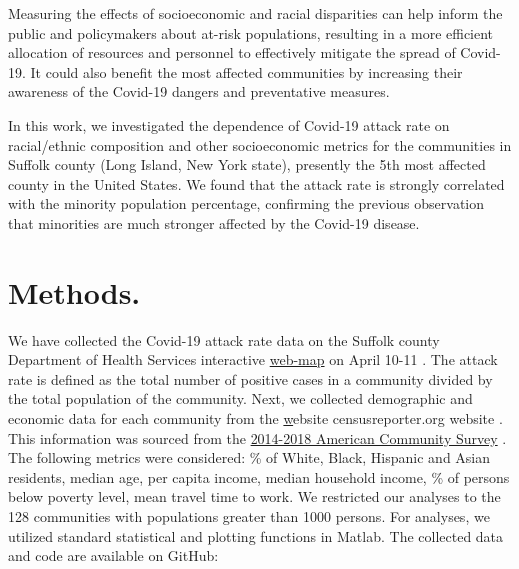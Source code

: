 \documentclass[twoside,12pt,onecolumn]{article}
\begin{document}
Measuring the effects of socioeconomic and racial disparities can help inform the public and policymakers about at-risk populations, resulting in a more efficient allocation of resources and personnel to effectively mitigate the spread of Covid-19. It could also benefit the most affected communities by increasing their awareness of the Covid-19 dangers and preventative measures.

In this work, we investigated the dependence of Covid-19 attack rate on racial/ethnic composition and other socioeconomic metrics for the communities in Suffolk county (Long Island, New York state), presently the 5th most affected county in the United States. We found that the attack rate is strongly correlated with the minority population percentage, confirming the previous observation that minorities are much stronger affected by the Covid-19 disease.

\section{Methods.}
We have collected the Covid-19 attack rate data on the Suffolk county Department of Health Services interactive \href{https://gis.suffolkcountyny.gov/portal/apps/opsdashboard/index.html#/76a26a0c83634266aa9efc35bd4f1975}{web-map} on April 10-11 \cite{SuffolkWebMap}.
The attack rate is defined as the total number of positive cases in a community divided by the total population of the community. Next, we collected demographic and economic data for each community from the \href{{censusreporter.org}}website {censusreporter.org} website \cite{CensusReporter}.
This information was sourced from the \href{https://www.census.gov/newsroom/press-releases/2019/acs-5-year.html}{2014-2018 American Community Survey} \cite{ACS}.  The following metrics were considered: \% of White, Black, Hispanic and Asian residents, median age, per capita income, median household income, \% of persons below poverty level, mean travel time to work.
We restricted our analyses to the 128 communities with populations greater than 1000 persons. For analyses, we utilized standard statistical and plotting functions in Matlab. The collected data and code are available on GitHub:
\end{document}
